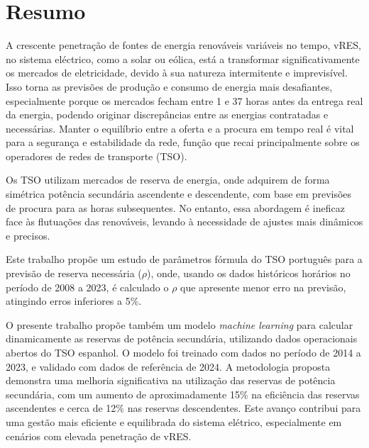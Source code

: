 \chapter{Resumo}
\justifying

A crescente penetração de fontes de energia renováveis variáveis no tempo, vRES, no sistema eléctrico, como a solar ou eólica, está a transformar significativamente os mercados de eletricidade, devido à sua natureza intermitente e imprevisível. Isso torna as previsões de produção e consumo de energia mais desafiantes, especialmente porque os mercados fecham entre 1 e 37 horas antes da entrega real da energia, podendo originar discrepâncias entre as energias contratadas e necessárias. Manter o equilíbrio entre a oferta e a procura em tempo real é vital para a segurança e estabilidade da rede, função que recai principalmente sobre os operadores de redes de transporte (TSO).\par
Os TSO utilizam mercados de reserva de energia, onde adquirem de forma simétrica potência secundária ascendente e descendente, com base em previsões de procura para as horas subsequentes. No entanto, essa abordagem é ineficaz face às flutuações das renováveis, levando à necessidade de ajustes mais dinâmicos e precisos.\par
Este trabalho propõe um estudo de parâmetros fórmula do TSO português para a previsão de reserva necessária ($\rho$), onde, usando os dados históricos horários no período de 2008 a 2023, é calculado o $\rho$ que apresente menor erro na previsão, atingindo erros inferiores a 5\%.\par
O presente trabalho propõe também um modelo \textit{machine learning} para calcular dinamicamente as reservas de potência secundária, utilizando dados operacionais abertos do TSO espanhol. O modelo foi treinado com dados no período de 2014 a 2023, e validado com dados de referência de 2024. A metodologia proposta demonstra uma melhoria significativa na utilização das reservas de potência secundária, com um aumento de aproximadamente 15\% na eficiência das reservas ascendentes e cerca de 12\% nas reservas descendentes. Este avanço contribui para uma gestão mais eficiente e equilibrada do sistema elétrico, especialmente em cenários com elevada penetração de vRES.\par




\vspace{0.5cm} %

